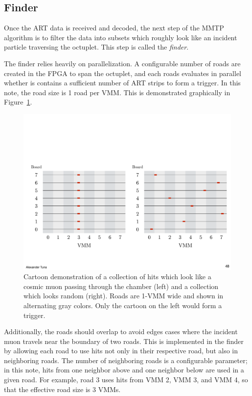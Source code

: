 \subsection{Finder}
\label{sec:alg-finder}

Once the ART data is received and decoded, the next step of the MMTP algorithm is to filter the data into subsets which roughly look like an incident particle traversing the octuplet. This step is called the \textit{finder}.

The finder relies heavily on parallelization. A configurable number of roads are created in the FPGA to span the octuplet, and each roads evaluates in parallel whether is contains a sufficient number of ART strips to form a trigger. In this note, the road size is 1 road per VMM. This is demonstrated graphically in Figure~\ref{fig:cartoon_road_demo}.

\begin{figure}[!htpb]
  \begin{center}
    \includegraphics[width=1.0\textwidth]{figures/cartoons/cartoon_road_demo}
  \end{center}
  \vspace{-20pt}
  \caption{Cartoon demonstration of a collection of hits which look like a cosmic muon passing through the chamber (left) and a collection which looks random (right). Roads are 1-VMM wide and shown in alternating gray colors. Only the cartoon on the left would form a trigger.}
  \label{fig:cartoon_road_demo}
\end{figure}

Additionally, the roads should overlap to avoid edges cases where the incident muon travels near the boundary of two roads. This is implemented in the finder by allowing each road to use hits not only in their respective road, but also in neighboring roads. The number of neighboring roads is a configurable parameter; in this note, hits from one neighbor above and one neighbor below are used in a given road. For example, road 3 uses hits from VMM 2, VMM 3, and VMM 4, so that the effective road size is 3 VMMs.


